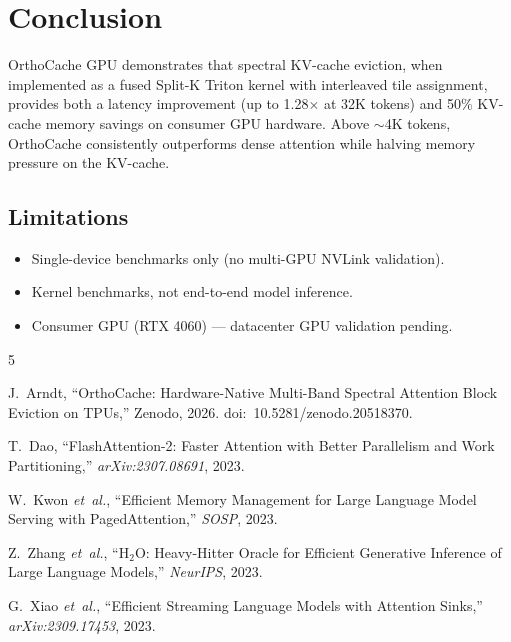 \documentclass[conference]{IEEEtran}
\begin{document}
\section{Conclusion}\label{sec:conclusion}

OrthoCache GPU demonstrates that spectral KV-cache eviction, when
implemented as a fused Split-K Triton kernel with interleaved tile
assignment, provides both a latency improvement (up to 1.28$\times$
at 32K tokens) and 50\% KV-cache memory savings on consumer GPU
hardware. Above $\sim$4K tokens, OrthoCache consistently outperforms
dense attention while halving memory pressure on the KV-cache.

\subsection{Limitations}

\begin{itemize}
\item Single-device benchmarks only (no multi-GPU NVLink validation).
\item Kernel benchmarks, not end-to-end model inference.
\item Consumer GPU (RTX 4060) --- datacenter GPU validation pending.
\end{itemize}




\begin{thebibliography}{5}

J.~Arndt, ``OrthoCache: Hardware-Native Multi-Band Spectral Attention
Block Eviction on TPUs,'' Zenodo, 2026.
doi:~10.5281/zenodo.20518370.

T.~Dao, ``FlashAttention-2: Faster Attention with Better Parallelism
and Work Partitioning,'' \textit{arXiv:2307.08691}, 2023.

W.~Kwon \textit{et~al.}, ``Efficient Memory Management for Large
Language Model Serving with PagedAttention,'' \textit{SOSP}, 2023.

Z.~Zhang \textit{et~al.}, ``H$_2$O: Heavy-Hitter Oracle for Efficient
Generative Inference of Large Language Models,'' \textit{NeurIPS}, 2023.

G.~Xiao \textit{et~al.}, ``Efficient Streaming Language Models with
Attention Sinks,'' \textit{arXiv:2309.17453}, 2023.

\end{thebibliography}
\end{document}
